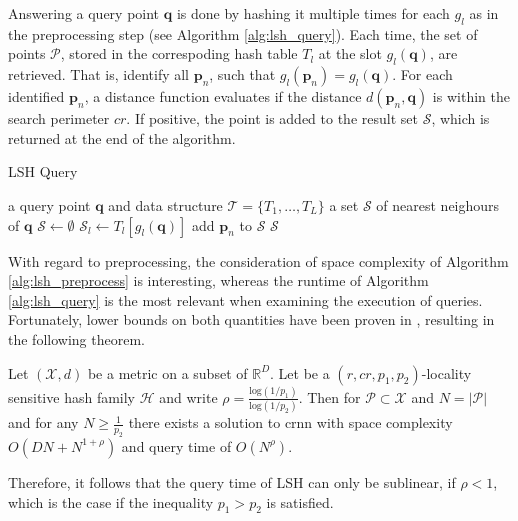 \documentclass[../../../main.tex]{subfiles}
\begin{document}
 Answering a query point $\bm{q}$ is done by hashing it multiple times for each $g_l$ as in the preprocessing step (see Algorithm \ref{alg:lsh_query}). Each time, the set of points $\mathcal{P}$, stored in the correspoding hash table $T_l$ at the slot $g_l(\bm{q})$, are retrieved. That is, identify all $\bm{p}_n$, such that $g_l(\bm{p}_n) = g_l(\bm{q})$. For each identified $\bm{p}_n$, a distance function evaluates if the distance $d(\bm{p}_n, \bm{q})$ is within the search perimeter $cr$. If positive, the point is added to the result set $\mathcal{S}$, which is returned at the end of the algorithm.

 \begin{algorithm}
    \caption{LSH Query}
    \label{alg:lsh_query}
    \begin{algorithmic}[1]
        \REQUIRE a query point $\bm{q}$ and data structure $\mathcal{T} = \{T_1, \dots, T_L\}$
        \ENSURE a set $\mathcal{S}$ of nearest neighours of $\bm{q}$
        \STATE $\mathcal{S} \leftarrow \emptyset$
            \STATE $\mathcal{S}_l \leftarrow T_l[g_l(\bm{q})]$
                        \STATE add $\bm{p}_n$ to $\mathcal{S}$
                    \ENDIF
                \ENDFOR
            \ENDIF
        \ENDFOR
        \RETURN $\mathcal{S}$
    \end{algorithmic}
 \end{algorithm}

 With regard to preprocessing, the consideration of space complexity of Algorithm \ref{alg:lsh_preprocess} is interesting, whereas the runtime of Algorithm \ref{alg:lsh_query} is the most relevant when examining the execution of queries. Fortunately, lower bounds on both quantities have been proven in \cite{motwani2006lower}, resulting in the following theorem.

\begin{theorem}
    Let $(\mathcal{X},d)$ be a metric on a subset of $\mathbb{R}^D$. Let be a $(r, cr, p_1, p_2)$-locality sensitive hash family $\mathcal{H}$ and write $\rho = \frac{\text{log}(1/p_1)}{\text{log}(1/p_2)}$. Then for $\mathcal{P} \subset \mathcal{X}$ and $N = |\mathcal{P}|$ and for any $N \geq \frac{1}{p_2}$ there exists a solution to \gls{crnn} with space complexity $O(DN+N^{1+\rho})$ and query time of $O(N^{\rho})$.
\end{theorem}

Therefore, it follows that the query time of LSH can only be sublinear, if $\rho < 1$, which is the case if the inequality $p_1 > p_2$ is satisfied.
\end{document}
